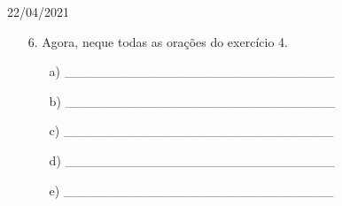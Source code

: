 \documentclass{SchoolBook}
\begin{document}
\begin{day}{22/04/2021}
\begin{enumerate}
            \item[6.] Agora, neque todas as orações do exercício 4.
            \begin{enumerate}
                \item[a)] \_\_\_\_\_\_\_\_\_\_\_\_\_\_\_\_\_\_\_\_\_\_\_\_\_\_\_\_\_
                \item[b)] \_\_\_\_\_\_\_\_\_\_\_\_\_\_\_\_\_\_\_\_\_\_\_\_\_\_\_\_\_
                \item[c)] \_\_\_\_\_\_\_\_\_\_\_\_\_\_\_\_\_\_\_\_\_\_\_\_\_\_\_\_\_
                \item[d)] \_\_\_\_\_\_\_\_\_\_\_\_\_\_\_\_\_\_\_\_\_\_\_\_\_\_\_\_\_
                \item[e)] \_\_\_\_\_\_\_\_\_\_\_\_\_\_\_\_\_\_\_\_\_\_\_\_\_\_\_\_\_
            \end{enumerate}
        \end{enumerate}
    \end{day}
    
\end{document}
